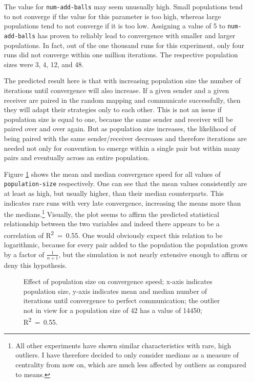 \documentclass[DIV=calc,BCOR=0mm,pagesize]{scrartcl}
\newcommand{\code}[1]{\texttt{#1}}
\begin{document}
The value for \code{num-add-balls} may seem unusually high.
Small populations tend to not converge if the value for this parameter is too high, whereas large populations tend to not converge if it is too low.
Assigning a value of 5 to \code{num-add-balls} has proven to reliably lead to convergence with smaller and larger populations.
In fact, out of the one thousand runs for this experiment, only four runs did not converge within one million iterations.
The respective population sizes were 3, 4, 12, and 48.

The predicted result here is that with increasing population size the number of iterations until convergence will also increase.
If a given sender and a given receiver are paired in the random mapping and communicate successfully, then they will adapt their strategies only to each other.
This is not an issue if population size is equal to one, because the same sender and receiver will be paired over and over again.
But as population size increases, the likelihood of being paired with the same sender/receiver decreases and therefore iterations are needed not only for convention to emerge within a single pair but within many pairs and eventually across an entire population.

Figure \ref{fig:pop} shows the mean and median convergence speed for all values of \code{population-size} respectively.
One can see that the mean values consistently are at least as high, but usually higher, than their median counterparts.
This indicates rare runs with very late convergence, increasing the means more than the medians.\footnote{All other experiments have shown similar characteristics with rare, high outliers. I have therefore decided to only consider medians as a measure of centrality from now on, which are much less affected by outliers as compared to means.}
Visually, the plot seems to affirm the predicted statistical relationship between the two variables and indeed there appears to be a correlation of R\textsuperscript{2}~=~0.55.
One would obviously expect this relation to be logarithmic, because for every pair added to the population the population grows by a factor of \(\frac{1}{n+1}\), but the simulation is not nearly extensive enough to affirm or deny this hypothesis.

\begin{figure}
	\centering
	\caption{Effect of population size on convergence speed; x-axis indicates population size, y-axis indicates mean and median number of iterations until convergence to perfect communication; the outlier not in view for a population size of 42 has a value of 14450; R\textsuperscript{2}~=~0.55.}
	\label{fig:pop}
\end{figure}
\end{document}
